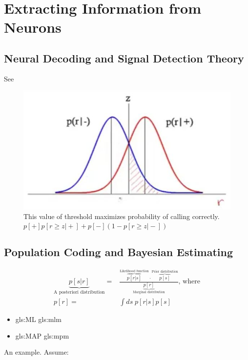 \documentclass[]{article}
\begin{document}
\section{Extracting Information from Neurons}\label{sec:week3}

\subsection{Neural Decoding and Signal Detection Theory}
See \cite{britten1992analysis}
\begin{figure}[H]
		\caption[Value of threshold that maximizes probability of correct call]{This value of threshold maximizes probability of calling correctly.
			$p[+]p[r\ge z\vert +] + p[-] (1-p[r\ge z\vert -])$}
		\includegraphics[width=\textwidth]{signal-detection1}
\end{figure}
\subsection{Population Coding and Bayesian Estimating}

\begin{align*}
	\underbrace{p[s\vert r]}_\text{A posteriori distribution} =& \frac{\overbrace{p[r\vert s]}^\text{Likelihood function} \cdot \overbrace{p[s]}^\text{Prior distribution}}{\underbrace{p[r]}_\text{Marginal distribution}} \text{, where}\\
	p[r] =& \int ds \; p[r\vert s] p[s]
\end{align*}

\begin{itemize}
	\item \gls{gls:ML} \gls{gls:mlm}
	\item \gls{gls:MAP} \gls{gls:mpm}
\end{itemize}
 An example. Assume:
 
\end{document}
